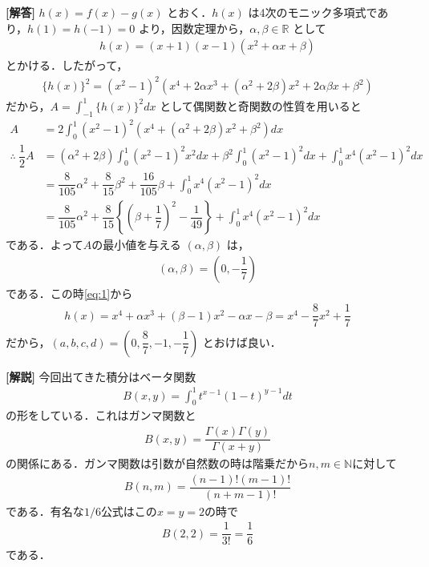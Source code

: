 \documentclass[../../main.tex]{subfiles}
\begin{document}
\begin{oframed}
  
\end{oframed}

{\bf [解答]}
$h(x)=f(x)-g(x)$ とおく．$h(x)$ は4次のモニック多項式であり，$h(1)=h(-1)=0$ より，因数定理から，$\alpha,\beta\in\mathbb{R}$ として
\begin{align}
  h(x)=(x+1)(x-1)(x^2+\alpha x+\beta) \label{eq:1}
\end{align}
とかける．したがって，
\begin{align}
  \{h(x)\}^2=(x^2-1)^2(x^4+2\alpha x^3+(\alpha^2+2\beta)x^2+2\alpha\beta x+\beta^2)
\end{align}
だから，$A=\displaystyle\int_{-1}^1\{h(x)\}^2dx$ として偶関数と奇関数の性質を用いると
\begin{align}
  A
  &=2\int_0^1(x^2-1)^2(x^4+(\alpha^2+2\beta)x^2+\beta^2)dx \\
  \therefore\
  \dfrac{1}{2}A
  &=\left(\alpha^2+2\beta\right)\int_0^1(x^2-1)^2x^2dx+\beta^2\int_0^1(x^2-1)^2dx+\int_0^1x^4(x^2-1)^2dx \\
  &=\dfrac{8}{105}\alpha^2+\dfrac{8}{15}\beta^2+\dfrac{16}{105}\beta+\int_0^1x^4(x^2-1)^2dx \\
  &=\dfrac{8}{105}\alpha^2+\dfrac{8}{15}\left\{\left(\beta+\dfrac{1}{7}\right)^2-\dfrac{1}{49}\right\}+\int_0^1x^4(x^2-1)^2dx \label{eq:2}
\end{align}
である．よって$A$の最小値を与える $(\alpha,\beta)$ は，
\begin{align}
  (\alpha,\beta)=\left(0,-\dfrac{1}{7}\right) \label{eq:3}
\end{align}
である．この時\cref{eq:1}から
\begin{align}
  h(x)=x^4+\alpha x^3+(\beta-1)x^2-\alpha x-\beta = x^4-\dfrac{8}{7}x^2+\dfrac{1}{7}
\end{align}
だから，$(a,b,c,d)=\left(0,\dfrac{8}{7},-1,-\dfrac{1}{7}\right)$ とおけば良い．

{\bf [解説]}
今回出てきた積分はベータ関数
\begin{align}
  B(x,y) = \int_0^{1}t^{x-1}(1-t)^{y-1} dt
\end{align}
の形をしている．これはガンマ関数と
\begin{align}
  B(x,y) = \dfrac{\Gamma(x)\Gamma(y)}{\Gamma(x+y)}
\end{align}
の関係にある．ガンマ関数は引数が自然数の時は階乗だから$n,m\in\mathbb{N}$に対して
\begin{align}
  B(n,m) = \dfrac{(n-1)!(m-1)!}{(n+m-1)!}
\end{align}
である．有名な$1/6$公式はこの$x=y=2$の時で
\begin{align}
  B(2,2) = \dfrac{1}{3!} = \dfrac{1}{6}
\end{align}
である．

\newpage
\end{document}

